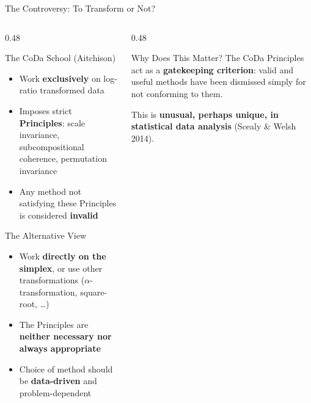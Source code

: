 

\begin{frame}{The Controversy: To Transform or Not?}

\begin{columns}[T]
  \begin{column}{0.48\textwidth}
    \begin{block}{The CoDa School (Aitchison)}
      \begin{itemize}
        \item Work \textbf{exclusively} on log-ratio transformed data
        \item Imposes strict \textbf{Principles}: scale invariance,
              subcompositional coherence, permutation invariance
        \item Any method not satisfying these Principles is
              considered \textbf{invalid}
      \end{itemize}
    \end{block}

    \vspace{0.3cm}
    \begin{block}{The Alternative View}
      \begin{itemize}
        \item Work \textbf{directly on the simplex}, or use other
              transformations ($\alpha$-transformation, square-root, \ldots)
        \item The Principles are \textbf{neither necessary nor
              always appropriate}
        \item Choice of method should be \textbf{data-driven} and
              problem-dependent
      \end{itemize}
    \end{block}
  \end{column}

  \begin{column}{0.48\textwidth}
    \begin{alertblock}{Why Does This Matter?}
      The CoDa Principles act as a \textbf{gatekeeping criterion}:
      valid and useful methods have been dismissed simply for not
      conforming to them.

      \vspace{0.2cm}
      This is \textbf{unusual, perhaps unique, in statistical
      data analysis} (Scealy \& Welsh 2014).
    \end{alertblock}


\end{column}
\end{columns}
\end{frame}
